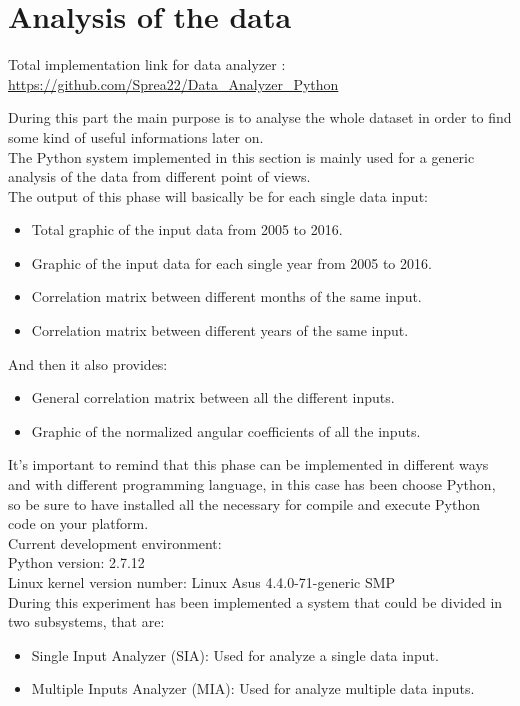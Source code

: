 
\section{Analysis of the data}
Total implementation link for data analyzer : \\
\url{https://github.com/Sprea22/Data_Analyzer_Python}

During this part the main purpose is to analyse the whole dataset in order to find some kind of useful informations later on. \\
The Python system implemented in this section is mainly used for a generic analysis of the data from different point of views.\\
The output of this phase will basically be for each single data input:
\begin{itemize}
\item Total graphic of the input data from 2005 to 2016.
\item Graphic of the input data for each single year from 2005 to 2016.
\item Correlation matrix between different months of the same input.
\item Correlation matrix between different years of the same input.
\end{itemize}

And then it also provides:
\begin{itemize}
\item General correlation matrix between all the different inputs.
\item Graphic of the normalized angular coefficients of all the inputs.
\end{itemize}

It's important to remind that this phase can be implemented in different ways and with different programming language, in this case has been choose Python, so be sure to have installed all the necessary for compile and execute Python code on your platform.\\
Current development environment:\\
Python version: 2.7.12\\
Linux kernel version number: Linux Asus 4.4.0-71-generic SMP\\

During this experiment has been implemented a system that could be divided in two subsystems, that are:
\begin{itemize}
\item Single Input Analyzer (SIA): Used for analyze a single data input.
\item Multiple Inputs Analyzer (MIA): Used for analyze multiple data inputs.
\end{itemize}
\newpage


